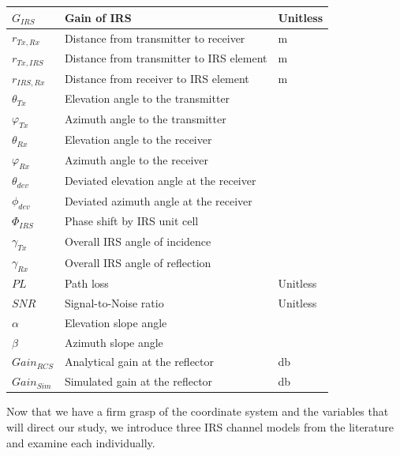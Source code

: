 \begin{table}[H]
\begin{tabular}{C{3cm}|C{7cm}|C{2.5cm}}
		\hline
		$G_{IRS}$ & Gain of \ac{IRS} & Unitless \\
		\hline 
		$r_{Tx,Rx}$ & Distance from transmitter to receiver & \si{\meter}\\
		\hline 
		$r_{Tx,IRS}$ & Distance from transmitter to \ac{IRS} element & \si{\meter}\\
		\hline 
		$r_{IRS,Rx}$ & Distance from receiver to \ac{IRS} element & \si{\meter} \\
		\hline 
		$\theta_{Tx}$ & Elevation angle to the transmitter & \si{\deg}\\
		\hline 
		$\varphi_{Tx} $  & Azimuth angle to the transmitter & \si{\deg} \\
		\hline 
		$\theta_{Rx}$ & Elevation angle to the receiver & \si{\deg}\\
		\hline 
		$\varphi_{Rx} $  & Azimuth angle to the receiver & \si{\deg} \\
		\hline 
		$\theta_{dev}$ & Deviated elevation angle at the receiver & \si{\deg}\\
		\hline 
		$\phi_{dev} $  & Deviated azimuth angle at the receiver & \si{\deg} \\
		\hline 
		$\Phi_{IRS} $  & Phase shift by IRS unit cell & \si{\deg} \\
		\hline 
		$\gamma_{Tx}$ & Overall IRS angle of incidence & \si{\deg}\\
		\hline 
		$\gamma_{Rx} $  & Overall IRS angle of reflection & \si{\deg}\\
		\hline 
		$PL$ & Path loss & Unitless\\ 
		\hline
		$SNR$ & Signal-to-Noise ratio & Unitless\\
		\hline
		$\alpha$ & Elevation slope angle & \si{\deg}\\
		\hline 
		$\beta$ & Azimuth slope angle & \si{\deg}\\
		\hline 
		$Gain_{RCS} $ & Analytical gain at the reflector & \si{\decibel} \\
		\hline 
		$Gain_{Sim} $ & Simulated gain at the reflector & \si{\decibel}\\
	\end{tabular}
\end{table}
Now that we have a firm grasp of the coordinate system and the variables that will direct our study, we introduce three IRS channel models from the literature and examine each individually.
